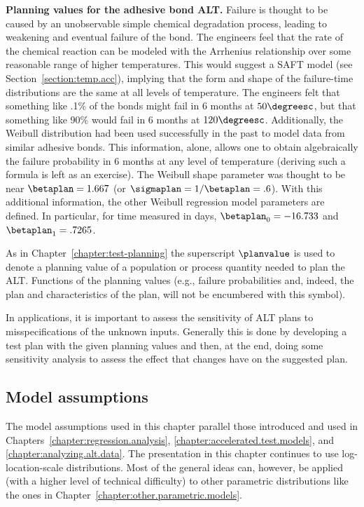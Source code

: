 \begin{example}
{\bf Planning values for the adhesive bond ALT.}
\label{example:alt.planning.values}
Failure is thought to be caused by an unobservable simple chemical
degradation process, leading to weakening and eventual failure of
the bond.  The engineers feel that the rate of the chemical reaction
can be modeled with the Arrhenius relationship over some reasonable
range of higher temperatures.  This would suggest a SAFT model (see
Section~\ref{section:temp.acc}), implying that the form and shape of
the failure-time distributions are the same at all levels of
temperature. The engineers felt that something like .1\% of the
bonds might fail in 6 months at $ 50\degreesc$, but that something
like 90\% would fail in 6 months at $ 120\degreesc$. Additionally,
the Weibull distribution had been used successfully in the past to
model data from similar adhesive bonds. This information, alone,
allows one to obtain algebraically the failure probability in 6
months at any level of temperature (deriving such a formula is left
as an exercise). The Weibull shape parameter was thought to be near
$\betaplan=1.667$ (or $\sigmaplan=1/\betaplan=.6$). With this
additional information, the other Weibull regression model
parameters are defined.  In particular, for time measured in days,
$\betaplan_{0}=-16.733$ and $\betaplan_{1}=.7265$.
\end{example}
As in Chapter~\ref{chapter:test-planning} the superscript
$\planvalue$ is used to denote a planning value of a population or
process quantity needed to plan the ALT. Functions of the planning
values (e.g., failure probabilities and, indeed, the plan and
characteristics of the plan, will not be encumbered with this
symbol).

In applications, it is important to assess the sensitivity of ALT
plans to misspecifications of the unknown inputs.  Generally this is
done by developing a test plan with the given planning values and
then, at the end, doing some sensitivity analysis to assess the effect
that changes have on the suggested plan.

\subsection{Model assumptions}
The model assumptions used in this chapter parallel those introduced
and used in Chapters~\ref{chapter:regression.analysis},
\ref{chapter:accelerated.test.models}, and
\ref{chapter:analyzing.alt.data}. The presentation
in this chapter continues to use log-location-scale
distributions. Most of the general ideas can, however, be applied
(with a higher level of technical difficulty) to other parametric
distributions like the ones in
Chapter~\ref{chapter:other.parametric.models}.

